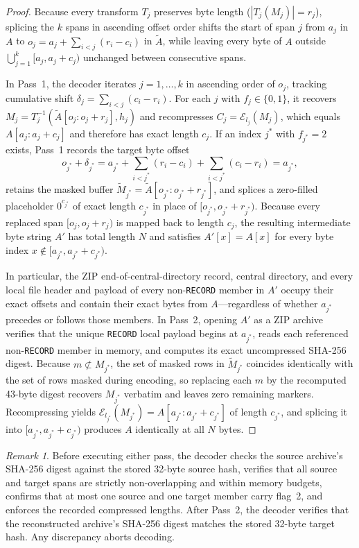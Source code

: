 \documentclass[10pt,letterpaper]{article}
\theoremstyle{remark}
\newtheorem{remark}{Remark}
\begin{document}
\begin{proof}
Because every transform $T_j$ preserves byte length ($|T_j(M_j)| = r_j$), splicing the $k$ spans in ascending offset order shifts the start of span $j$ from $a_j$ in $A$ to $o_j = a_j + \sum_{i < j}(r_i - c_i)$ in $\widetilde{A}$, while leaving every byte of $A$ outside $\bigcup_{j=1}^k [a_j, a_j + c_j)$ unchanged between consecutive spans.

In Pass~1, the decoder iterates $j = 1, \dots, k$ in ascending order of $o_j$, tracking cumulative shift $\delta_j = \sum_{i < j}(c_i - r_i)$. For each $j$ with $f_j \in \{0,1\}$, it recovers $M_j = T_j^{-1}(\widetilde{A}[o_j : o_j + r_j], h_j)$ and recompresses $C_j = \mathcal{E}_{l_j}(M_j)$, which equals $A[a_j : a_j + c_j]$ and therefore has exact length $c_j$. If an index $j^*$ with $f_{j^*} = 2$ exists, Pass~1 records the target byte offset
\[
  o_{j^*} + \delta_{j^*} = a_{j^*} + \sum_{i < j^*}(r_i - c_i) + \sum_{i < j^*}(c_i - r_i) = a_{j^*},
\]
retains the masked buffer $\widetilde{M}_{j^*} = \widetilde{A}[o_{j^*} : o_{j^*} + r_{j^*}]$, and splices a zero-filled placeholder $0^{c_{j^*}}$ of exact length $c_{j^*}$ in place of $[o_{j^*}, o_{j^*} + r_{j^*})$. Because every replaced span $[o_j, o_j + r_j)$ is mapped back to length $c_j$, the resulting intermediate byte string $A'$ has total length $N$ and satisfies $A'[x] = A[x]$ for every byte index $x \notin [a_{j^*}, a_{j^*} + c_{j^*})$.

In particular, the ZIP end-of-central-directory record, central directory, and every local file header and payload of every non-\texttt{RECORD} member in $A'$ occupy their exact offsets and contain their exact bytes from $A$---regardless of whether $a_{j^*}$ precedes or follows those members. In Pass~2, opening $A'$ as a ZIP archive verifies that the unique \texttt{RECORD} local payload begins at $a_{j^*}$, reads each referenced non-\texttt{RECORD} member in memory, and computes its exact uncompressed SHA-256 digest. Because $m \not\subset M_{j^*}$, the set of masked rows in $\widetilde{M}_{j^*}$ coincides identically with the set of rows masked during encoding, so replacing each $m$ by the recomputed 43-byte digest recovers $M_{j^*}$ verbatim and leaves zero remaining markers. Recompressing yields $\mathcal{E}_{l_{j^*}}(M_{j^*}) = A[a_{j^*} : a_{j^*} + c_{j^*}]$ of length $c_{j^*}$, and splicing it into $[a_{j^*}, a_{j^*} + c_{j^*})$ produces $A$ identically at all $N$ bytes.
\end{proof}

\begin{remark}
Before executing either pass, the decoder checks the source archive's SHA-256 digest against the stored 32-byte source hash, verifies that all source and target spans are strictly non-overlapping and within memory budgets, confirms that at most one source and one target member carry flag~2, and enforces the recorded compressed lengths. After Pass~2, the decoder verifies that the reconstructed archive's SHA-256 digest matches the stored 32-byte target hash. Any discrepancy aborts decoding.
\end{remark}
\end{document}
